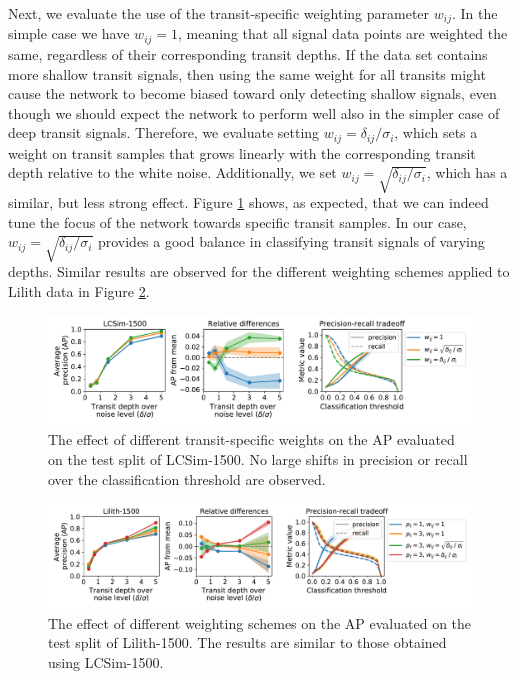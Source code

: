 Next, we evaluate the use of the transit-specific weighting parameter $w_{ij}$. In the simple case we have $w_{ij} = 1$, meaning that all signal data points are weighted the same, regardless of their corresponding transit depths. If the data set contains more shallow transit signals, then using the same weight for all transits might cause the network to become biased toward only detecting shallow signals, even though we should expect the network to perform well also in the simpler case of deep transit signals. Therefore, we evaluate setting $w_{ij} = \delta_{ij}/\sigma_i$, which sets a weight on transit samples that grows linearly with the corresponding transit depth relative to the white noise. Additionally, we set $w_{ij} = \sqrt{\delta_{ij}/\sigma_i}$, which has a similar, but less strong effect. Figure \ref{fig:lcsim_weight_w} shows, as expected, that we can indeed tune the focus of the network towards specific transit samples. In our case, $w_{ij} = \sqrt{\delta_{ij}/\sigma_i}$ provides a good balance in classifying transit signals of varying depths. Similar results are observed for the different weighting schemes applied to Lilith data in Figure \ref{fig:lilith_weighting}.

\begin{figure}
    \centering
    \includegraphics[width=0.9\linewidth]{Experiments/Figures/Models/lcsim1500_AP_weighting-w.pdf}
    \caption{The effect of different transit-specific weights on the AP evaluated on the test split of LCSim-1500. No large shifts in precision or recall over the classification threshold are observed. }
    \label{fig:lcsim_weight_w}
\end{figure}

\begin{figure}
    \centering
    \includegraphics[width=0.95\linewidth]{Experiments/Figures/Models/lilith1500_AP_weighting.pdf}
    \caption{The effect of different weighting schemes on the AP evaluated on the test split of Lilith-1500. The results are similar to those obtained using LCSim-1500.}
    \label{fig:lilith_weighting}
\end{figure}

